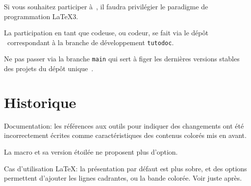 \begin{tdocimp}
    Si vous souhaitez participer à \thisproj\,, il faudra privilégier le paradigme de programmation \LaTeX3.
\end{tdocimp}


La participation en tant que codeuse, ou codeur, se fait via le dépôt \thisrepo\ correspondant à la branche de développement \verb#tutodoc#.


\begin{tdoccaut}
	Ne pas passer via la branche \verb#main# qui sert à figer les dernières versions stables des projets du dépôt unique \thismonorepo\,.
\end{tdoccaut}


\section{Historique}

\small

\begin{tdocfix}[version = 1.7.1, date = 2024-12-18]
	\item Documentation: les références aux outils pour indiquer des changements ont été incorrectement écrites comme caractéristiques des contenus colorés mis en avant.
\end{tdocfix}


\begin{tdocbreak}
	\item La macro  et sa version étoilée ne proposent plus d'option.

	\item Cas d'utilisation \LaTeX: la présentation par défaut est plus sobre, et des options permettent d'ajouter les lignes cadrantes, ou la bande colorée. Voir juste après.
\end{tdocbreak}


